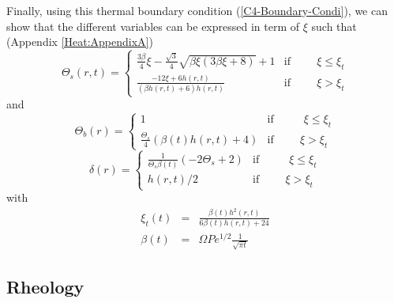 Finally,      using      this     thermal      boundary      condition
(\ref{C4-Boundary-Condi}), we  can show  that the  different variables
can   be   expressed   in   term  of   $\xi$   such   that   (Appendix
\ref{Heat:AppendixA})
\begin{equation}
  \Theta_s(r,t)=
  \begin{cases}
    \frac{3 \beta}{4} \xi - \frac{\sqrt{3}}{4} \sqrt{\beta \xi \left(3 \beta \xi + 8\right)} + 1 & \text{if} \hspace{1cm} \xi\leq \xi_t \\
    \frac{- 12  \xi +  6 h{\left  (r,t \right  )}}{\left(\beta h{\left
            (r,t  \right  )} +  6\right)  h{\left  (r,t \right  )}}  &
    \text{if} \hspace{1cm} \xi > \xi_t
  \end{cases}
  \label{C4-TS}
\end{equation}
and
\begin{equation}
  \Theta_b(r)=
  \begin{cases}
    1 &\text{if } \hspace{1cm} \xi\leq \xi_t \\
    \frac{\Theta_{s}}{4}  \left(\beta(t)  h{\left  (r,t  \right  )}  +
      4\right) & \text{if} \hspace{1cm} \xi > \xi_t
  \end{cases}
  \label{C4-TB}
\end{equation}
\begin{equation}
  \delta(r)=
  \begin{cases}
    \frac{1}{\Theta_{s} \beta(t)} \left(- 2 \Theta_{s} + 2\right) &\text{if } \hspace{1cm} \xi\leq \xi_t \\
    h(r,t)/2 & \text{if} \hspace{1cm} \xi > \xi_t
  \end{cases}
  \label{C4-DELTA}
\end{equation}
with
\begin{eqnarray}
  \xi_t(t)&=&\frac{\beta(t) h^{2}{\left (r,t \right )}}{6 \beta(t) h{\left (r,t \right )}
              + 24}\\
  \beta(t) &=& \Omega Pe^{1/2}\frac{1}{\sqrt{\pi t}}
\end{eqnarray}

\subsection{Rheology}
\label{sec:rheology}

